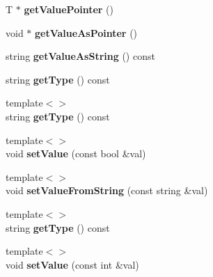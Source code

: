 \begin{DoxyCompactItemize}
\item 
\hypertarget{classrrp_1_1_parameter_a92e5269d353410af88bcce2baddfcaf9}{T $\ast$ {\bfseries get\-Value\-Pointer} ()}\label{classrrp_1_1_parameter_a92e5269d353410af88bcce2baddfcaf9}

\item 
\hypertarget{classrrp_1_1_parameter_a263084a80ef5f128efefe6cdfa2f1757}{void $\ast$ {\bfseries get\-Value\-As\-Pointer} ()}\label{classrrp_1_1_parameter_a263084a80ef5f128efefe6cdfa2f1757}

\item 
\hypertarget{classrrp_1_1_parameter_a24d311dd987ec8f5ddf08d0fcdf97d48}{string {\bfseries get\-Value\-As\-String} () const }\label{classrrp_1_1_parameter_a24d311dd987ec8f5ddf08d0fcdf97d48}

\item 
\hypertarget{classrrp_1_1_parameter_a3d84dc98a1aa14ba2d33dd49e7ff1424}{string {\bfseries get\-Type} () const }\label{classrrp_1_1_parameter_a3d84dc98a1aa14ba2d33dd49e7ff1424}

\item 
\hypertarget{classrrp_1_1_parameter_a49aebd913ae26cd0a3c2cce3c758171e}{{\footnotesize template$<$$>$ }\\string {\bfseries get\-Type} () const}\label{classrrp_1_1_parameter_a49aebd913ae26cd0a3c2cce3c758171e}

\item 
\hypertarget{classrrp_1_1_parameter_ae33e10d2704a7f9a37f73ae8fbed70f6}{{\footnotesize template$<$$>$ }\\void {\bfseries set\-Value} (const bool \&val)}\label{classrrp_1_1_parameter_ae33e10d2704a7f9a37f73ae8fbed70f6}

\item 
\hypertarget{classrrp_1_1_parameter_a1621a0f9b6cd7c6973f1a660622becf7}{{\footnotesize template$<$$>$ }\\void {\bfseries set\-Value\-From\-String} (const string \&val)}\label{classrrp_1_1_parameter_a1621a0f9b6cd7c6973f1a660622becf7}

\item 
\hypertarget{classrrp_1_1_parameter_a49aebd913ae26cd0a3c2cce3c758171e}{{\footnotesize template$<$$>$ }\\string {\bfseries get\-Type} () const}\label{classrrp_1_1_parameter_a49aebd913ae26cd0a3c2cce3c758171e}

\item 
\hypertarget{classrrp_1_1_parameter_a43de8eb31be062ff0522ca06399263ee}{{\footnotesize template$<$$>$ }\\void {\bfseries set\-Value} (const int \&val)}\label{classrrp_1_1_parameter_a43de8eb31be062ff0522ca06399263ee}


\end{DoxyCompactItemize}
